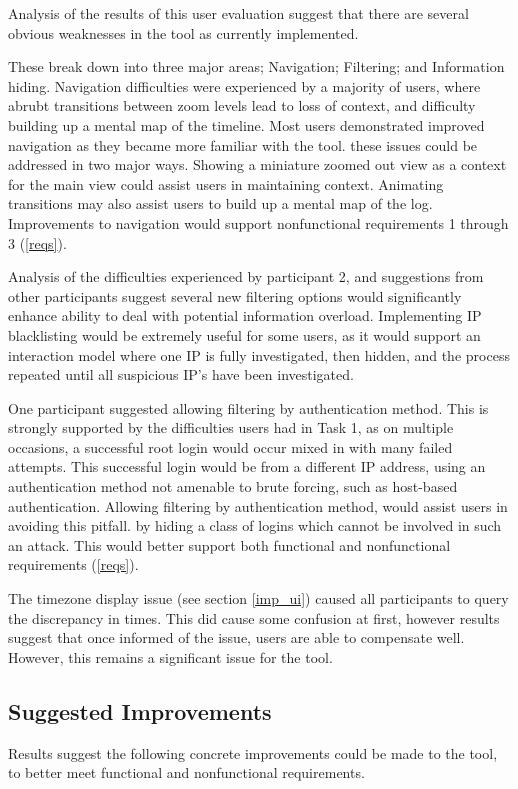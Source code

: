 Analysis of the results of this user evaluation suggest that there are several obvious weaknesses in the tool as currently implemented. 

These break down into three major areas; Navigation; Filtering; and Information hiding.
Navigation difficulties were experienced by a majority of users, where abrubt transitions between zoom levels lead to loss of context, and difficulty building up a mental map of the timeline. 
Most users demonstrated improved navigation as they became more familiar with the tool. these issues could be addressed in two major ways. Showing a miniature zoomed out view as a context for the main view could assist users in maintaining context. 
Animating transitions may also assist users to build up a mental map of the log. Improvements to navigation would support nonfunctional requirements 1 through 3 (\ref{reqs}). 

Analysis of the difficulties experienced by participant 2, and suggestions from other participants suggest several new filtering options would significantly enhance ability to deal with potential information overload. 
Implementing IP blacklisting would be extremely useful for some users, as it would support an interaction model where one IP is fully investigated, then hidden, and the process repeated until all suspicious IP's have been investigated. 

One participant suggested allowing filtering by authentication method. This is strongly supported by the difficulties users had in Task 1, as on multiple occasions, a successful root login would occur mixed in with many failed attempts. This successful login would be from a different IP address, using an authentication method not amenable to brute forcing, such as host-based authentication. Allowing filtering by authentication method, would assist users in avoiding this pitfall. by hiding a class of logins which cannot be involved in such an attack. This would better support both functional and nonfunctional requirements (\ref{reqs}).

The timezone display issue (see section \ref{imp_ui}) caused all participants to query the discrepancy in times. This did cause some confusion at first, however results suggest that once informed of the issue, users are able to compensate well. However, this remains a significant issue for the tool.

\subsection {Suggested Improvements}
Results suggest the following concrete improvements could be made to the tool, to better meet functional and nonfunctional requirements. 

